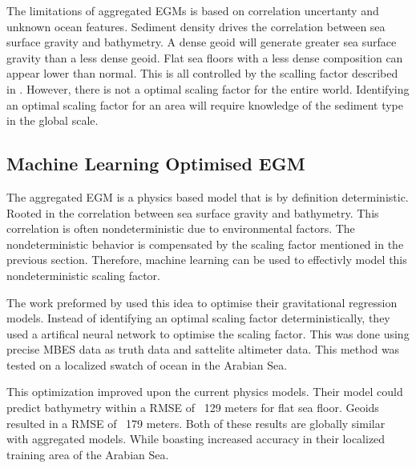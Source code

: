 \par
The limitations of aggregated \ac{EGM}s is based on correlation uncertanty and unknown ocean features.
Sediment density drives the correlation between sea surface gravity and bathymetry.
A dense geoid will generate greater sea surface gravity than a less dense geoid.
Flat sea floors with a less dense composition can appear lower than normal.
This is all controlled by the scalling factor described in \cite{smith1994bathymetric}. 
However, there is not a optimal scaling factor for the entire world.
Identifying an optimal scaling factor for an area will require knowledge of the sediment type in the global scale.


\subsection{Machine Learning Optimised \ac{EGM}}
The aggregated \ac{EGM} is a physics based model that is by definition deterministic.
Rooted in the correlation between sea surface gravity and bathymetry.
This correlation is often nondeterministic due to environmental factors.
The nondeterministic behavior is compensated by the scaling factor mentioned in the previous section.
Therefore, machine learning can be used to effectivly model this nondeterministic scaling factor.

\par
The work preformed by \cite{jena2012prediction} used this idea to optimise their gravitational regression models.
Instead of identifying an optimal scaling factor deterministically, they used a artifical neural network to optimise the scaling factor.
This was done using precise \ac{MBES} data as truth data and sattelite altimeter data.
This method was tested on a localized swatch of ocean in the Arabian Sea.

\par
This optimization improved upon the current physics models.
Their model could predict bathymetry within a \ac{RMSE} of ~129 meters for flat sea floor.
Geoids resulted in a \ac{RMSE} of ~179 meters.
Both of these results are globally similar with aggregated models.
While boasting increased accuracy in their localized training area of the Arabian Sea.

